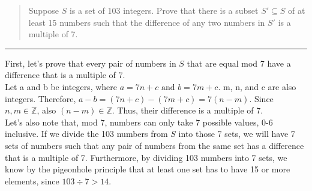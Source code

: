 \documentclass[11pt]{article}
\begin{document}



\begin{quote}
    Suppose $S$ is a set of 103 integers. Prove that there is a subset $S' \subseteq S$ of at least 15 numbers such that the difference of any two numbers in $S'$ is a multiple of 7.
\end{quote}
\hrule



\begin{solution}
    First, let's prove that every pair of numbers in $S$ that are equal mod 7 have a difference that is a multiple of 7. \\
    Let a and b be integers, where $a = 7n + c\text{ and }b = 7m + c$. m, n, and c are also integers. Therefore, $a - b = (7n + c) - (7m + c) = 7(n - m)$. Since $n, m \in \mathbb{Z}$, also $(n - m) \in \mathbb{Z}$. Thus, their difference is a multiple of 7. \\
    Let's also note that, mod 7, numbers can only take 7 possible values, 0-6 inclusive. If we divide the 103 numbers from $S$ into those 7 sets, we will have 7 sets of numbers such that any pair of numbers from the same set has a difference that is a multiple of 7. Furthermore, by dividing 103 numbers into 7 sets, we know by the pigeonhole principle that at least one set has to have 15 or more elements, since $103 \div 7 > 14$.
\end{solution}
\end{document}
